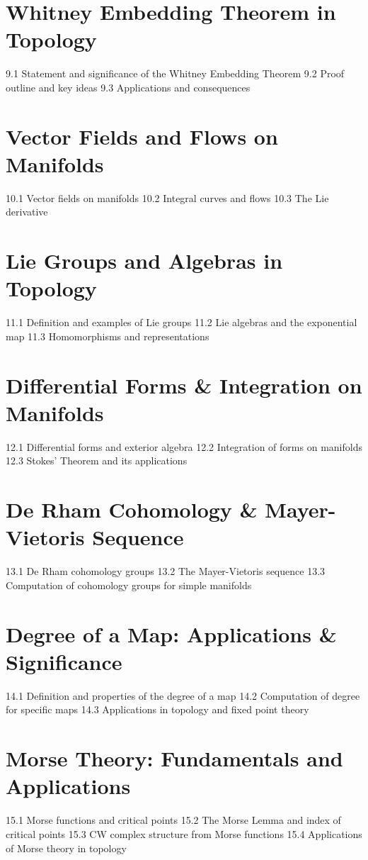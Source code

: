 \section{Whitney Embedding Theorem in Topology}
9.1 Statement and significance of the Whitney Embedding Theorem
9.2 Proof outline and key ideas
9.3 Applications and consequences
\section{Vector Fields and Flows on Manifolds}
10.1 Vector fields on manifolds
10.2 Integral curves and flows
10.3 The Lie derivative
\section{Lie Groups and Algebras in Topology}
11.1 Definition and examples of Lie groups
11.2 Lie algebras and the exponential map
11.3 Homomorphisms and representations
\section{Differential Forms \& Integration on Manifolds}
12.1 Differential forms and exterior algebra
12.2 Integration of forms on manifolds
12.3 Stokes' Theorem and its applications
\section{De Rham Cohomology \& Mayer-Vietoris Sequence}
13.1 De Rham cohomology groups
13.2 The Mayer-Vietoris sequence
13.3 Computation of cohomology groups for simple manifolds
\section{Degree of a Map: Applications \& Significance}
14.1 Definition and properties of the degree of a map
14.2 Computation of degree for specific maps
14.3 Applications in topology and fixed point theory
\section{Morse Theory: Fundamentals and Applications}
15.1 Morse functions and critical points
15.2 The Morse Lemma and index of critical points
15.3 CW complex structure from Morse functions
15.4 Applications of Morse theory in topology
